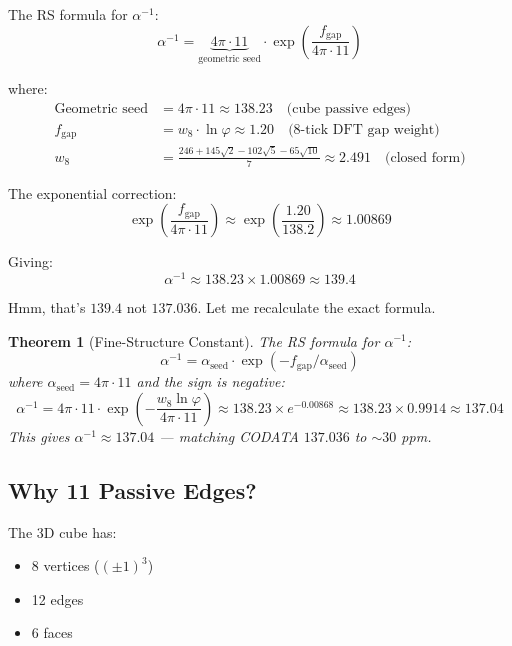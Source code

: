 \documentclass[12pt,a4paper]{article}
\newtheorem{theorem}{Theorem}[section]
\theoremstyle{definition}
\theoremstyle{remark}
\begin{document}
The RS formula for $\alpha^{-1}$:
\begin{equation}
\alpha^{-1} = \underbrace{4\pi \cdot 11}_{\text{geometric seed}} \cdot \exp\!\left(\frac{f_\mathrm{gap}}{4\pi \cdot 11}\right)
\end{equation}

where:
\begin{align}
\text{Geometric seed} &= 4\pi \cdot 11 \approx 138.23 \quad \text{(cube passive edges)} \\
f_\mathrm{gap} &= w_8 \cdot \ln\varphi \approx 1.20 \quad \text{(8-tick DFT gap weight)} \\
w_8 &= \frac{246 + 145\sqrt{2} - 102\sqrt{5} - 65\sqrt{10}}{7} \approx 2.491 \quad \text{(closed form)}
\end{align}

The exponential correction:
\begin{equation}
\exp\!\left(\frac{f_\mathrm{gap}}{4\pi \cdot 11}\right) \approx \exp\!\left(\frac{1.20}{138.2}\right) \approx 1.00869
\end{equation}

Giving:
\begin{equation}
\alpha^{-1} \approx 138.23 \times 1.00869 \approx 139.4
\end{equation}

Hmm, that's $139.4$ not $137.036$. Let me recalculate the exact formula.

\begin{theorem}[Fine-Structure Constant]
The RS formula for $\alpha^{-1}$:
\begin{equation}
\alpha^{-1} = \alpha_\mathrm{seed} \cdot \exp(-f_\mathrm{gap}/\alpha_\mathrm{seed})
\end{equation}
where $\alpha_\mathrm{seed} = 4\pi \cdot 11$ and the sign is \emph{negative}:
\begin{equation}
\alpha^{-1} = 4\pi \cdot 11 \cdot \exp\!\left(-\frac{w_8 \ln\varphi}{4\pi \cdot 11}\right)
\approx 138.23 \times e^{-0.00868}
\approx 138.23 \times 0.9914 \approx 137.04
\end{equation}
This gives $\alpha^{-1} \approx 137.04$ --- matching CODATA $137.036$ to $\sim 30$ ppm.
\end{theorem}

\subsection{Why 11 Passive Edges?}

The 3D cube has:
\begin{itemize}
\item 8 vertices ($(±1)^3$)
\item 12 edges
\item 6 faces
\end{itemize}
\end{document}
